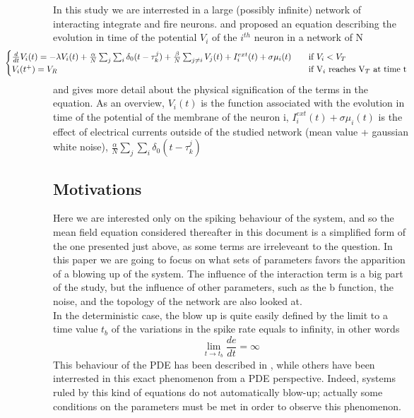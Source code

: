 	In this study we are interrested in a large (possibly infinite) network of interacting integrate and fire neurons. \cite{lewis_dynamics_2003} and \cite{ostojic_synchronization_2009} proposed an equation describing the evolution in time of the potential $V_i$ of the $i^{th}$ neuron in a network of N
		\begin{equation}
			\hspace*{-2cm} \begin{cases}
				\frac{d}{dt}V_i(t)=-\lambda V_i(t)+\frac{\alpha}{N}\sum_j\sum_i\delta_0(t-\tau_k^j)+\frac{\beta}{N}\sum_{j\neq i}V_j(t)+I_i^{ext}(t)+\sigma\mu_i(t) &\quad\text{if }V_i<V_T\\
				V_i(t^+)=V_R & \quad\text{if V}_i\text{ reaches V}_T\text{ at time t}\\
			\end{cases}
		\end{equation}
	\cite{ostojic_synchronization_2009} and \cite{delarue:hal-00747565} gives more detail about the physical signification of the terms in the equation. As an overview, $V_i(t)$ is the function associated with the evolution in time of the potential of the membrane of the neuron i, $I_i^{ext}(t)+\sigma\mu_i(t)$ is the effect of electrical currents outside of the studied network (mean value + gaussian white noise), $\frac{\alpha}{N}\sum_j\sum_i\delta_0(t-\tau_k^j)$ 

	\subsection{Motivations}
	Here we are interested only on the spiking behaviour of the system, and so the mean field equation considered thereafter in this document is a simplified form of the one presented just above, as some terms are irreleveant to the question.
	In this paper we are going to focus on what sets of parameters favors the apparition of a blowing up of the system. The influence of the interaction term is a big part of the study, but the influence of other parameters, such as the b function, the noise, and the topology of the network are also looked at.\\
	In the deterministic case, the blow up is quite easily defined by the limit to a time value $t_b$ of the variations in the spike rate equals to infinity, in other words
	\begin{equation}
		\lim_{t\rightarrow t_b}\frac{de}{dt}=\infty
	\end{equation}
	This behaviour of the PDE has been described in \cite{delarue:hal-00747565}, while others have been interrested in this exact phenomenon from a PDE perspective. Indeed, systems ruled by this kind of equations do not automatically blow-up; actually some conditions on the parameters must be met in order to observe this phenomenon.

